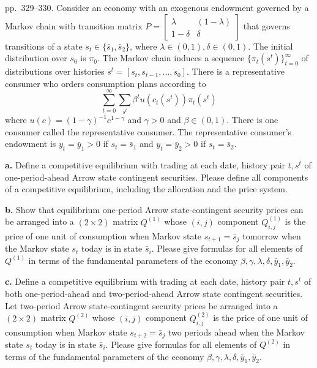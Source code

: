 \documentclass[12pt, letterpaper]{article}
\begin{document}
\begin{tcolorbox}[evenbox,title={Exercise 8.28 \quad Recovering probabilities from prices, IV}]
\begin{tcolorbox}[questionbox]
pp.~329--330. Consider an economy with an exogenous endowment governed by a Markov chain with transition
matrix $P=\begin{bmatrix}\lambda&(1-\lambda)\\1-\delta&\delta\end{bmatrix}$ that governs transitions of a state
$s_t\in\{\bar s_1,\bar s_2\}$, where $\lambda\in(0,1),\delta\in(0,1)$. The initial distribution over $s_0$ is $\pi_0$. The
Markov chain induces a sequence $\{\pi_t(s^t)\}_{t=0}^\infty$ of distributions over histories
$s^t=[s_t,s_{t-1},\dots,s_0]$. There is a representative consumer who orders consumption plans according to
\[
\sum_{t=0}^\infty\sum_{s^t}\beta^tu(c_t(s^t))\pi_t(s^t)
\]
where $u(c)=(1-\gamma)^{-1}c^{1-\gamma}$ and $\gamma>0$ and $\beta\in(0,1)$. There is one consumer called the
representative consumer. The representative consumer's endowment is $y_t=\bar y_1>0$ if $s_t=\bar s_1$ and
$y_t=\bar y_2>0$ if $s_t=\bar s_2$.

\textbf{a.} Define a competitive equilibrium with trading at each date, history pair $t,s^t$ of one-period-ahead
Arrow state contingent securities. Please define all components of a competitive equilibrium, including the
allocation and the price system.

\textbf{b.} Show that equilibrium one-period Arrow state-contingent security prices can be arranged into a
$(2\times2)$ matrix $Q^{(1)}$ whose $(i,j)$ component $Q^{(1)}_{i,j}$ is the price of one unit of consumption when
Markov state $s_{t+1}=\bar s_j$ tomorrow when the Markov state $s_t$ today is in state $\bar s_i$. Please give
formulas for all elements of $Q^{(1)}$ in terms of the fundamental parameters of the economy
$\beta,\gamma,\lambda,\delta,\bar y_1,\bar y_2$.

\textbf{c.} Define a competitive equilibrium with trading at each date, history pair $t,s^t$ of both
one-period-ahead and two-period-ahead Arrow state contingent securities. Let two-period Arrow
state-contingent security prices be arranged into a $(2\times2)$ matrix $Q^{(2)}$ whose $(i,j)$ component
$Q^{(2)}_{i,j}$ is the price of one unit of consumption when Markov state $s_{t+2}=\bar s_j$ two periods ahead
when the Markov state $s_t$ today is in state $\bar s_i$. Please give formulas for all elements of $Q^{(2)}$ in
terms of the fundamental parameters of the economy $\beta,\gamma,\lambda,\delta,\bar y_1,\bar y_2$.


\end{tcolorbox}
\end{tcolorbox}
\end{document}
